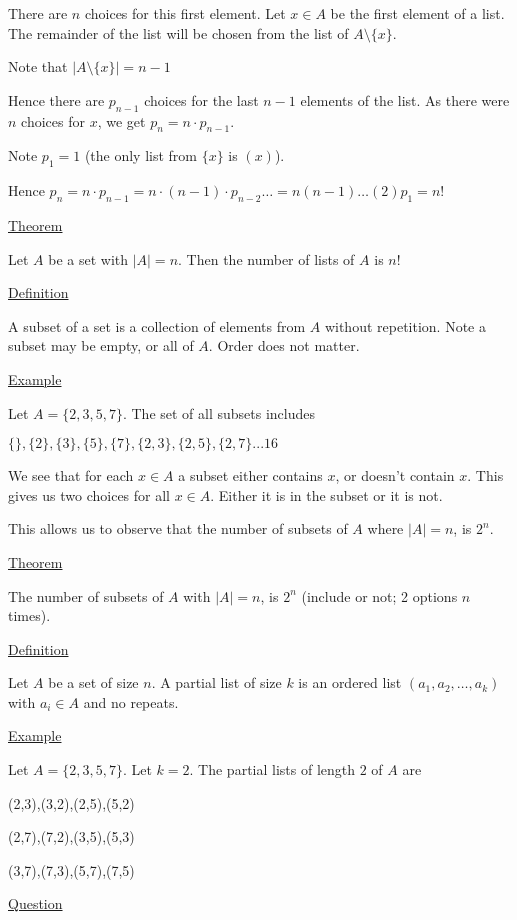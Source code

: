 \documentclass{article}
\begin{document}
There are $n$ choices for this first element. Let $x \in A$ be the first element of a list. The remainder of the list will be chosen from the list of $A \setminus \{x\}$.

Note that $|A \setminus \{x\} | = n - 1$

Hence there are $p_{n-1}$ choices for the last $n-1$ elements of the list. As there were $n$ choices for $x$, we get $p_n = n \cdot p_{n-1}$.

Note $p_1 = 1$ (the only list from $\{x\}$ is $(x)$). 

Hence  $p_n = n \cdot p_{n-1} = n \cdot (n-1) \cdot p_{n-2} \ldots = n(n-1) \ldots (2)p_1 = n!$

\underline{Theorem} 

Let $A$ be a set with $|A| = n$. Then the number of lists of $A$ is $n!$

\underline{Definition}

A subset of a set is a collection of elements from $A$ without repetition. Note a subset may be empty, or all of $A$. Order does not matter.

\underline{Example} 

Let $A = \{2,3,5,7\}$. The set of all subsets includes

$\{\}, \{2\}, \{3\}, \{5\}, \{7\}, \{2,3\}, \{2,5\}, \{2,7\}... 16$

We see that for each $x \in A$ a subset either contains $x$, or doesn't contain $x$. This gives us two choices for all $x \in A$. Either it is in the subset or it is not. 

This allows us to observe that the number of subsets of $A$ where $|A| = n$, is $2^n$. 

\underline{Theorem}

The number of subsets of $A$ with $|A| = n$, is $2^n$ (include or not; 2 options $n$ times). 

\underline{Definition}

Let $A$ be a set of size $n$. A partial list of size $k$ is an ordered list $(a_1, a_2, \ldots, a_k)$ with $a_i \in A$ and no repeats. 

\underline{Example}

Let $A = \{2,3,5,7\}$. Let $k = 2$. The partial lists of length $2$ of $A$ are

(2,3),(3,2),(2,5),(5,2)

(2,7),(7,2),(3,5),(5,3)

(3,7),(7,3),(5,7),(7,5)

\underline{Question}
\end{document}
